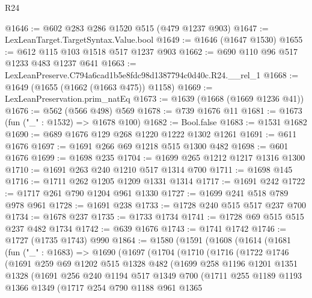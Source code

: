 \begin{lexlean}{R24}
\begin{coremodule}
@1646 := @602 @283 @286 @1520 @515 (@479 @1237 @903)
@1647 := LexLeanTarget.TargetSyntax.Value.bool
@1649 := @1646 (@1647 @1530)
@1655 := @612 @115 @103 @1518 @517 @1237 @903
@1662 := @690 @110 @96 @517 @1233 @483 @1237 @641
@1663 := LexLeanPreserve.C794a6cad1b5e8fdc98d1387794c0d40c.R24.__rel_1
@1668 := @1649 (@1655 (@1662 (@1663 @475)) @1158)
@1669 := LexLeanPreservation.prim_natEq
@1673 := @1639 (@1668 (@1669 @1236 @41))
@1676 := @562 (@566 @498) @569
@1678 := @739 @1676 @11
@1681 := @1673 (fun ("_" : @1532) => @1678 @100)
@1682 := Bool.false
@1683 := @1531 @1682
@1690 := @689 @1676 @129 @268 @1220 @1222 @1302 @1261
@1691 := @611 @1676
@1697 := @1691 @266 @69 @1218 @515 @1300 @482
@1698 := @601 @1676
@1699 := @1698 @235
@1704 := @1699 @265 @1212 @1217 @1316 @1300
@1710 := @1691 @263 @240 @1210 @517 @1314 @700
@1711 := @1698 @145
@1716 := @1711 @262 @1205 @1209 @1331 @1314
@1717 := @1691 @242
@1722 := @1717 @261 @790 @1204 @961 @1330
@1727 := @1699 @241 @518 @789 @978 @961
@1728 := @1691 @238
@1733 := @1728 @240 @515 @517 @237 @700
@1734 := @1678 @237
@1735 := @1733 @1734
@1741 := @1728 @69 @515 @515 @237 @482 @1734
@1742 := @639 @1676
@1743 := @1741 @1742
@1746 := @1727 (@1735 @1743) @990
@1864 := @1580
    (@1591
      (@1608
        (@1614
          (@1681
            (fun ("_" : @1683) =>
            @1690
              (@1697
                (@1704
                  (@1710
                    (@1716
                      (@1722
                        @1746
                        (@1691
                          @259
                          @69
                          @1202
                          @515
                          @1328
                          @482
                          (@1699
                            @258
                            @1196
                            @1201
                            @1351
                            @1328
                            (@1691
                              @256
                              @240
                              @1194
                              @517
                              @1349
                              @700
                              (@1711
                                @255
                                @1189
                                @1193
                                @1366
                                @1349
                                (@1717
                                  @254
                                  @790
                                  @1188
                                  @961
                                  @1365

\end{coremodule}
\end{lexlean}
